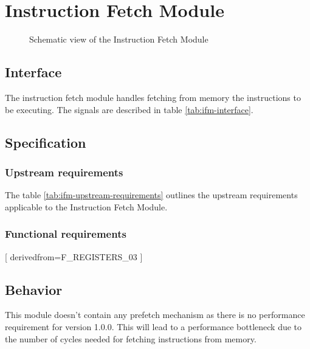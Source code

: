 \section{Instruction Fetch Module}

\begin{figure}[h!]
    \centering
    
    \caption{Schematic view of the Instruction Fetch Module}
    \label{fig:ifm}
\end{figure}

\subsection{Interface}

\begin{content}
The instruction fetch module handles fetching from memory the instructions to be executing. The signals are described in table \ref{tab:ifm-interface}. 
\end{content}



\subsection{Specification}

\subsubsection{Upstream requirements}

The table \ref{tab:ifm-upstream-requirements} outlines the upstream requirements applicable to the Instruction Fetch Module.



\subsubsection{Functional requirements}

[
  derivedfrom=F\_REGISTERS\_03
]



\subsection{Behavior}

\begin{content}
  This module doesn't contain any prefetch mechanism as there is no performance requirement for version 1.0.0. This will lead to a performance bottleneck due to the number of cycles needed for fetching instructions from memory.
\end{content}

